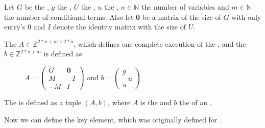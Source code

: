 \begin{definition}
	\label{def:iteration}
	Let $G$ be the \guardmatrix, $g$ the \guardconstants, $U$ the \updatematrix, $u$ the \updateconstants, $n\in \mathbb{N}$ the number of variables and $m \in \mathbb{N}$ the number of conditional terms. \newline
	Also let \textbf{0} be a matrix of the size of $G$ with only entry's 0 and $I$ denote the identity matrix with the size of $U$. \newline
	
	The \iterationmatrix $A \in \mathbb{Z}^{2*n+m \times 2*n}$, which defines one complete execution of the \loopt, and the \iterationconstants $b\in \mathbb{Z}^{2*n+m} $ is defined as
	\begin{figure}[H]
		\centering
		$A = \begin{pmatrix} G & \textbf{0} \\ M & -I \\ -M & I \end{pmatrix}$ and $b = \begin{pmatrix} g \\ -u \\ u \end{pmatrix}$ \cite{leike2014geometric}
	\end{figure}	
\end{definition}

\begin{definition}[LOOP]
	The \loopt is defined as a tuple $(A, b)$, where $A$ is the \iterationmatrix and $b$ the \iterationconstants of an \its. %
\end{definition}

Now we can define the key element, which was originally defined for . 

